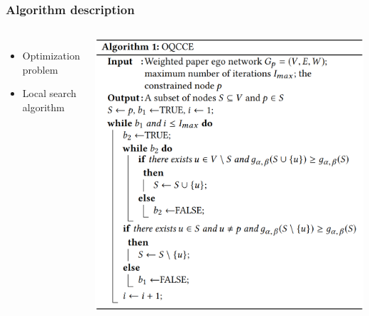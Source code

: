 \begin{frame}
\frametitle{Algorithm description}
\begin{columns}

\begin{itemize}
    \item Optimization problem
    \item Local search algorithm
\end{itemize}

\includegraphics[width=1\linewidth]{img/algorithm}


\end{columns}
\end{frame}
